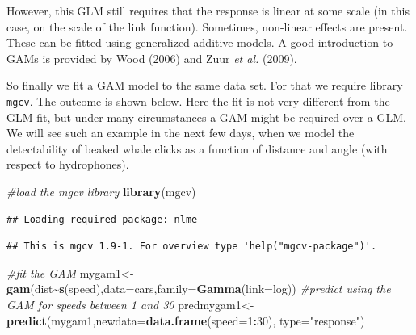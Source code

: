 \documentclass[
]{article}
\newenvironment{Shaded}{\begin{snugshade}}{\end{snugshade}}
\newcommand{\AttributeTok}[1]{\textcolor[rgb]{0.13,0.29,0.53}{#1}}
\newcommand{\CommentTok}[1]{\textcolor[rgb]{0.56,0.35,0.01}{\textit{#1}}}
\newcommand{\DecValTok}[1]{\textcolor[rgb]{0.00,0.00,0.81}{#1}}
\newcommand{\FunctionTok}[1]{\textcolor[rgb]{0.13,0.29,0.53}{\textbf{#1}}}
\newcommand{\NormalTok}[1]{#1}
\newcommand{\OtherTok}[1]{\textcolor[rgb]{0.56,0.35,0.01}{#1}}
\newcommand{\SpecialCharTok}[1]{\textcolor[rgb]{0.81,0.36,0.00}{\textbf{#1}}}
\newcommand{\StringTok}[1]{\textcolor[rgb]{0.31,0.60,0.02}{#1}}
\begin{document}
However, this GLM still requires that the response is linear at some
scale (in this case, on the scale of the link function). Sometimes,
non-linear effects are present. These can be fitted using generalized
additive models. A good introduction to GAMs is provided by Wood (2006)
and Zuur \emph{et al.} (2009).

So finally we fit a GAM model to the same data set. For that we require
library \texttt{mgcv}. The outcome is shown below. Here the fit is not
very different from the GLM fit, but under many circumstances a GAM
might be required over a GLM. We will see such an example in the next
few days, when we model the detectability of beaked whale clicks as a
function of distance and angle (with respect to hydrophones).

\begin{Shaded}
\begin{Highlighting}[]
\CommentTok{\#load the mgcv library}
\FunctionTok{library}\NormalTok{(mgcv)}
\end{Highlighting}
\end{Shaded}

\begin{verbatim}
## Loading required package: nlme
\end{verbatim}

\begin{verbatim}
## This is mgcv 1.9-1. For overview type 'help("mgcv-package")'.
\end{verbatim}

\begin{Shaded}
\begin{Highlighting}[]
\CommentTok{\#fit the GAM}
\NormalTok{mygam1}\OtherTok{\textless{}{-}}\FunctionTok{gam}\NormalTok{(dist}\SpecialCharTok{\textasciitilde{}}\FunctionTok{s}\NormalTok{(speed),}\AttributeTok{data=}\NormalTok{cars,}\AttributeTok{family=}\FunctionTok{Gamma}\NormalTok{(}\AttributeTok{link=}\NormalTok{log))}
\CommentTok{\#predict using the GAM for speeds between 1 and 30}
\NormalTok{predmygam1}\OtherTok{\textless{}{-}}\FunctionTok{predict}\NormalTok{(mygam1,}\AttributeTok{newdata=}\FunctionTok{data.frame}\NormalTok{(}\AttributeTok{speed=}\DecValTok{1}\SpecialCharTok{:}\DecValTok{30}\NormalTok{),}
\AttributeTok{type=}\StringTok{"response"}\NormalTok{)}
\end{Highlighting}
\end{Shaded}
\end{document}
